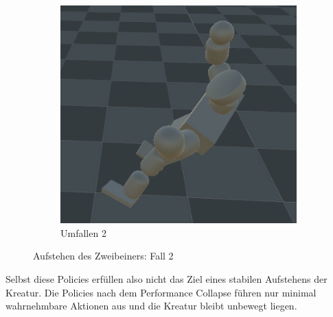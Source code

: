 \begin{figure}
\begin{subfigure}[b]{0.18\textwidth}
	\end{subfigure}
	\begin{subfigure}[b]{0.18\textwidth}
	\centering
	\includegraphics[width=\textwidth]{resources/img/2BAufstehen/Fall2_umfallen}
	\caption{Umfallen 2}
\end{subfigure}
	\caption{Aufstehen des Zweibeiners: Fall 2}
	\label{fig:2BAufstehen2}
\end{figure}
Selbst diese Policies erfüllen also nicht das Ziel eines stabilen Aufstehens der Kreatur.
Die Policies nach dem Performance Collapse führen nur minimal wahrnehmbare Aktionen aus und die Kreatur bleibt unbewegt liegen. 






